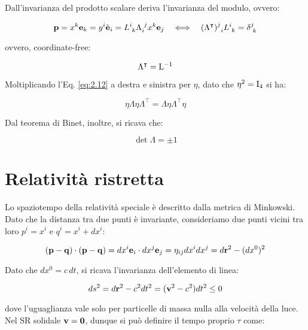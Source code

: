 Dall'invarianza del prodotto scalare deriva l'invarianza del modulo, ovvero:

\begin{equation}
	\mathbf{p} = x^{k} \mathbf{e}_k = y^i \tilde{\mathbf{e}}_i = L^i_{\,\,k} \Lambda^{\,\,j}_i x^k \mathbf{e}_j \quad \Longleftrightarrow \quad (\Lambda^{\intercal})^j_{\,\,\,i} L^i_{\,\,k} = \delta^j_{\,\,k}
	\label{eq:2.13}
\end{equation}

ovvero, coordinate-free:

\begin{equation}
	\Lambda^{\intercal} = \mathrm{L}^{-1}
	\label{eq:2.14}
\end{equation}

Moltiplicando l'Eq. \ref{eq:2.12} a destra e sinistra per $ \eta $, dato che $ \eta^2 = \mathrm{I}_4 $ si ha:

\begin{equation}
	\eta \Lambda \eta \Lambda^{\intercal} = \Lambda \eta \Lambda^{\intercal} \eta
	\label{eq:2.15}
\end{equation}

Dal teorema di Binet, inoltre, si ricava che:

\begin{equation}
	\det \Lambda = \pm 1
	\label{eq:2.16}
\end{equation}

\section{Relatività ristretta}

Lo spaziotempo della relatività speciale è descritto dalla metrica di Minkowski.\\
Dato che la distanza tra due punti è invariante, consideriamo due punti vicini tra loro $ p^i = x^i $ e $ q^i = x^i + dx^i $:

\begin{equation}
	(\mathbf{p} - \mathbf{q}) \cdot (\mathbf{p} - \mathbf{q}) = dx^i \mathbf{e}_i \cdot dx^j \mathbf{e}_j = \eta_{ij} dx^i dx^j = d\mathbf{r}^2 - (dx^0)^2
	\label{eq:2.17}
\end{equation}

Dato che $ dx^0 = c\,dt $, si ricava l'invarianza dell'elemento di linea:

\begin{equation}
	ds^2 = d\mathbf{r}^2 - c^2 dt^2 = (\mathbf{v}^2 - c^2) dt^2 \le 0
	\label{eq:2.18}
\end{equation}

dove l'uguaglianza vale solo per particelle di massa nulla alla velocità della luce.\\
Nel SR solidale $ \mathbf{v} = \mathbf{0} $, dunque si può definire il tempo proprio $ \tau $ come:


